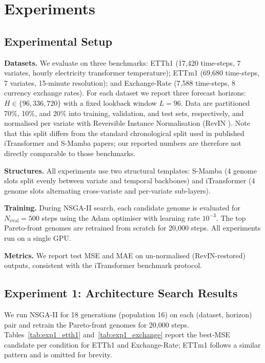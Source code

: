 \section{Experiments}
\label{sec:experiments}

\subsection{Experimental Setup}

\textbf{Datasets.}
We evaluate on three benchmarks:
ETTh1 \cite{zhou2021ett} (17{,}420 time-steps, 7 variates, hourly electricity transformer temperature);
ETTm1 \cite{zhou2021ett} (69{,}680 time-steps, 7 variates, 15-minute resolution);
and Exchange-Rate \cite{wu2021autoformer} (7{,}588 time-steps, 8 currency exchange rates).
For each dataset we report three forecast horizons: $H \in \{96, 336, 720\}$ with a fixed lookback window $L = 96$.
Data are partitioned 70\%, 10\%, and 20\% into training, validation, and test sets, respectively, and normalised per variate with Reversible Instance Normalisation (RevIN \cite{kim2022revin}).
Note that this split differs from the standard chronological split used in published iTransformer and S-Mamba papers; our reported numbers are therefore not directly comparable to those benchmarks.

\textbf{Structures.}
All experiments use two structural templates: S-Mamba (4 genome slots split evenly between variate and temporal backbones) and iTransformer (4 genome slots alternating cross-variate and per-variate sub-layers).

\textbf{Training.}
During NSGA-II search, each candidate genome is evaluated for $N_{\mathrm{eval}} = 500$ steps using the Adam optimiser with learning rate $10^{-3}$.
The top Pareto-front genomes are retrained from scratch for 20{,}000 steps.
All experiments run on a single GPU.

\textbf{Metrics.}
We report test MSE and MAE on un-normalised (RevIN-restored) outputs, consistent with the iTransformer benchmark protocol.

\subsection{Experiment 1: Architecture Search Results}
\label{sec:exp_search}

We run NSGA-II for 18 generations (population 16) on each (dataset, horizon) pair and retrain the Pareto-front genomes for 20{,}000 steps.
Tables~\ref{tab:exp1_etth1} and~\ref{tab:exp1_exchange} report the best-MSE candidate per condition for ETTh1 and Exchange-Rate; ETTm1 follows a similar pattern and is omitted for brevity.

